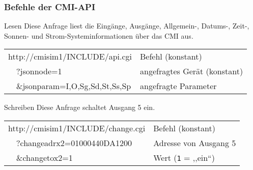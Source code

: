 \documentclass{beamer}
\begin{document}
\begin{frame}
    \frametitle{Befehle der CMI-API}
    \begin{exampleblock}{Lesen}
        Diese Anfrage liest die Eingänge, Ausgänge, Allgemein-, Datums-, Zeit-, Sonnen- und Strom-Systeminformationen über das CMI aus.
        \begin{table}\begin{tabular}{>{\ttfamily}l|l}
            http://cmisim1/INCLUDE/api.cgi & Befehl (konstant) \\
            ~~?jsonnode=1 & angefragtes Gerät (konstant) \\
            ~~\&jsonparam=\alert{I,O,Sg,Sd,St,Ss,Sp} & angefragte Parameter
        \end{tabular}\end{table}
    \end{exampleblock}

    \begin{exampleblock}{Schreiben}
        Diese Anfrage schaltet Ausgang 5 ein.
        \begin{table}\begin{tabular}{>{\ttfamily}l|l}
            http://cmisim1/INCLUDE/change.cgi & Befehl (konstant) \\
            ~~?changeadrx2=\alert{01000440DA1200} & Adresse von Ausgang 5 \\
            ~~\&changetox2=\alert{1} & Wert (\texttt{1} = ,,ein``)
        \end{tabular}\end{table}
    \end{exampleblock}
\end{frame}
\end{document}
